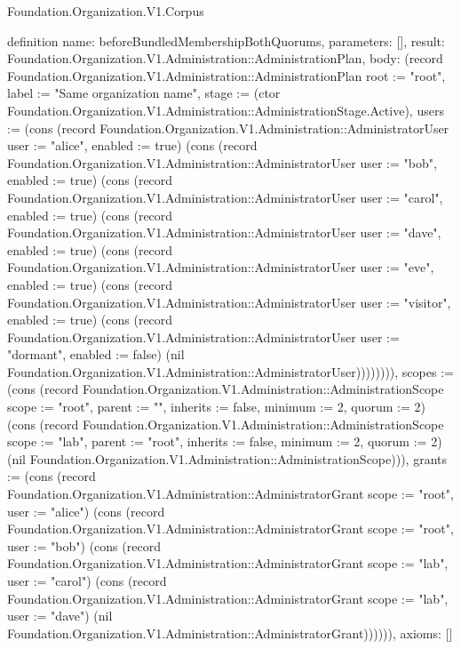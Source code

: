 \begin{lexlean}{Foundation.Organization.V1.Corpus}
\begin{semanticmodule}
definition{
  name: beforeBundledMembershipBothQuorums,
  parameters: [],
  result: Foundation.Organization.V1.Administration::AdministrationPlan,
  body: (record Foundation.Organization.V1.Administration::AdministrationPlan {root := "root", label := "Same organization name", stage := (ctor Foundation.Organization.V1.Administration::AdministrationStage.Active), users := (cons (record Foundation.Organization.V1.Administration::AdministratorUser {user := "alice", enabled := true}) (cons (record Foundation.Organization.V1.Administration::AdministratorUser {user := "bob", enabled := true}) (cons (record Foundation.Organization.V1.Administration::AdministratorUser {user := "carol", enabled := true}) (cons (record Foundation.Organization.V1.Administration::AdministratorUser {user := "dave", enabled := true}) (cons (record Foundation.Organization.V1.Administration::AdministratorUser {user := "eve", enabled := true}) (cons (record Foundation.Organization.V1.Administration::AdministratorUser {user := "visitor", enabled := true}) (cons (record Foundation.Organization.V1.Administration::AdministratorUser {user := "dormant", enabled := false}) (nil Foundation.Organization.V1.Administration::AdministratorUser)))))))), scopes := (cons (record Foundation.Organization.V1.Administration::AdministrationScope {scope := "root", parent := "", inherits := false, minimum := 2, quorum := 2}) (cons (record Foundation.Organization.V1.Administration::AdministrationScope {scope := "lab", parent := "root", inherits := false, minimum := 2, quorum := 2}) (nil Foundation.Organization.V1.Administration::AdministrationScope))), grants := (cons (record Foundation.Organization.V1.Administration::AdministratorGrant {scope := "root", user := "alice"}) (cons (record Foundation.Organization.V1.Administration::AdministratorGrant {scope := "root", user := "bob"}) (cons (record Foundation.Organization.V1.Administration::AdministratorGrant {scope := "lab", user := "carol"}) (cons (record Foundation.Organization.V1.Administration::AdministratorGrant {scope := "lab", user := "dave"}) (nil Foundation.Organization.V1.Administration::AdministratorGrant)))))}),
  axioms: []
}


\end{semanticmodule}
\end{lexlean}
